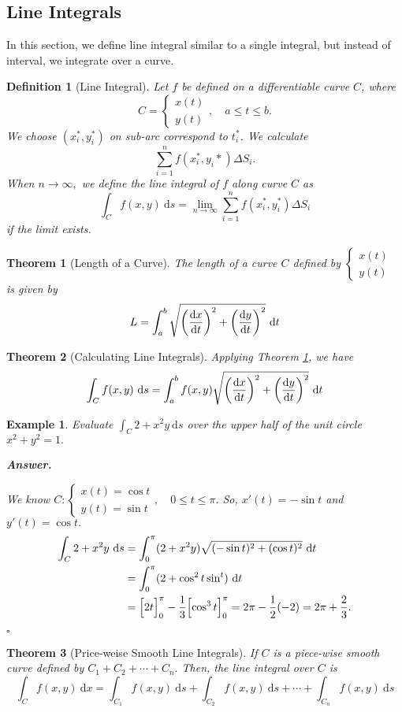 \documentclass[12pt,a4paper]{article}
\newtheorem{thm}{Theorem}[subsection]
\newtheorem{df}{Definition}[subsection]
\newtheorem{eg}{Example}[subsection]
\newenvironment*{ans}{\par\indent\textbf{\textit{Answer. }}\par}{\par\hfill{$\square$}\par}
\def\dsst{\displaystyle}
\def\d{{\mathrm{d}}}
\def\dx{\d x}
\def\ds{\d s}
\def\dt{\d t}
\def\intC{\dsst\int_C}
\begin{document}
\subsection{Line Integrals}
In this section, we define line integral similar to a single integral, but instead of interval, we integrate over a curve.
\begin{df}[Line Integral]
	Let $f$ be defined on a differentiable curve $C$, where \[C=\begin{cases}x(t)\\y(t)\end{cases},\quad a\leq t\leq b.\] We choose $(x_i^*, y_i^*)$ on sub-arc correspond to $t_i^*$. We calculate \[\sum_{i=1}^nf(x_i^*,y_i*)\Delta S_i.\] When $n\to\infty,$ we define the line integral of $f$ along curve $C$ as \[\intC f(x,y)\ \ds=\lim_{n\to\infty}\sum_{i=1}^n f(x_i^*, y_i^*)\Delta S_i\] if the limit exists. 
\end{df}
\begin{thm}[Length of a Curve]\label{thm5.2.1}
	The length of a curve $C$ defined by $\begin{cases}x(t)\\y(t)\end{cases}$ is given by \[L=\int_a^b\sqrt{\qty(\dv{x}{t})^2+\qty(\dv{y}{t})^2}\ \dt\]
\end{thm}
\begin{thm}[Calculating Line Integrals]
	Applying Theorem \ref{thm5.2.1}, we have \[\intC f(x,y)\ \ds=\int_a^bf(x,y)\sqrt{\qty(\dv{x}{t})^2+\qty(\dv{y}{t})^2}\ \dt\]
\end{thm}
\begin{eg}
	Evaluate $\intC2+x^2y\ \ds$ over the upper half of the unit circle $x^2+y^2=1.$
	\begin{ans}
		We know $C:\begin{cases}x(t)=\cos{t}\\y(t)=\sin{t}\end{cases},\quad 0\leq t\leq\pi.$ So, $x'(t)=-\sin{t}$ and $y'(t)=\cos{t}.$ \[\begin{aligned}\intC2+x^2y\ \ds&=\int_0^\pi(2+x^2y)\sqrt{(-\sin{t})^2+(\cos{t})^2}\ \dt\\&=\int_0^\pi(2+\cos^2t\sin^t)\ \dt\\&=\qty\Big[2t]_0^\pi-\dfrac{1}{3}\qty\Big[\cos^3t]_0^\pi=2\pi-\dfrac{1}{2}(-2)=2\pi+\dfrac{2}{3}.\end{aligned}\]
	\end{ans}
\end{eg}
\begin{thm}[Price-weise Smooth Line Integrals]
	If $C$ is a piece-wise smooth curve defined by $C_1+C_2+\cdots+C_n.$ Then, the line integral over $C$ is \[\intC f(x,y)\ \dx=\int_{C_1}f(x,y)\ \ds+\int_{C_2}f(x,y)\ \ds+\cdots+\int_{C_n}f(x,y)\ \ds\]	
\end{thm}
\end{document}
